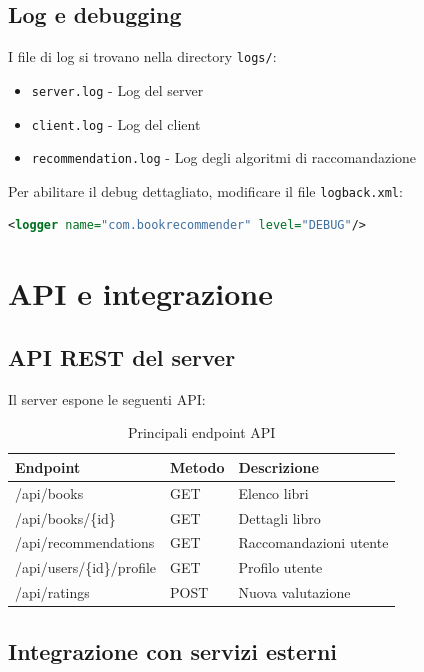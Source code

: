 \documentclass[12pt,a4paper]{article}
\begin{document}
\subsection{Log e debugging}

I file di log si trovano nella directory \texttt{logs/}:

\begin{itemize}
    \item \texttt{server.log} - Log del server
    \item \texttt{client.log} - Log del client
    \item \texttt{recommendation.log} - Log degli algoritmi di raccomandazione
\end{itemize}

Per abilitare il debug dettagliato, modificare il file \texttt{logback.xml}:

\begin{lstlisting}[language=xml]
<logger name="com.bookrecommender" level="DEBUG"/>
\end{lstlisting}

\section{API e integrazione}

\subsection{API REST del server}

Il server espone le seguenti API:

\begin{table}[h]
\centering
\begin{tabular}{@{}lll@{}}
\toprule
Endpoint & Metodo & Descrizione \\ \midrule
/api/books & GET & Elenco libri \\
/api/books/\{id\} & GET & Dettagli libro \\
/api/recommendations & GET & Raccomandazioni utente \\
/api/users/\{id\}/profile & GET & Profilo utente \\
/api/ratings & POST & Nuova valutazione \\ \bottomrule
\end{tabular}
\caption{Principali endpoint API}
\end{table}

\subsection{Integrazione con servizi esterni}
\end{document}
